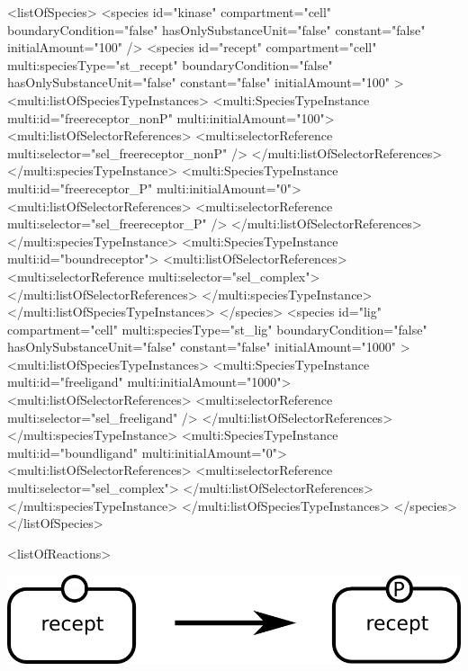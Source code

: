 \begin{example}
    <listOfSpecies>
      <species id="kinase" compartment="cell" boundaryCondition="false" 
               hasOnlySubstanceUnit="false" constant="false" initialAmount="100" />
      <species id="recept" compartment="cell" multi:speciesType="st_recept" 
               boundaryCondition="false" hasOnlySubstanceUnit="false" 
               constant="false" initialAmount="100" >
        <multi:listOfSpeciesTypeInstances>
          <multi:SpeciesTypeInstance multi:id="freereceptor_nonP" 
                                     multi:initialAmount="100">
            <multi:listOfSelectorReferences>
              <multi:selectorReference multi:selector="sel_freereceptor_nonP" />
            </multi:listOfSelectorReferences>
          </multi:speciesTypeInstance>
          <multi:SpeciesTypeInstance multi:id="freereceptor_P" 
                                     multi:initialAmount="0">
            <multi:listOfSelectorReferences>
              <multi:selectorReference multi:selector="sel_freereceptor_P" />
            </multi:listOfSelectorReferences>
          </multi:speciesTypeInstance>
          <multi:SpeciesTypeInstance multi:id="boundreceptor">
            <multi:listOfSelectorReferences>
              <multi:selectorReference multi:selector="sel_complex">
            </multi:listOfSelectorReferences>
          </multi:speciesTypeInstance>
        </multi:listOfSpeciesTypeInstances>
      </species>
      <species id="lig" compartment="cell" multi:speciesType="st_lig" 
                       boundaryCondition="false" 
               hasOnlySubstanceUnit="false" constant="false" initialAmount="1000" >
        <multi:listOfSpeciesTypeInstances>
          <multi:SpeciesTypeInstance multi:id="freeligand" multi:initialAmount="1000">
            <multi:listOfSelectorReferences>
              <multi:selectorReference multi:selector="sel_freeligand" />
            </multi:listOfSelectorReferences>
          </multi:speciesTypeInstance>
          <multi:SpeciesTypeInstance multi:id="boundligand" multi:initialAmount="0">
            <multi:listOfSelectorReferences>
              <multi:selectorReference multi:selector="sel_complex">
            </multi:listOfSelectorReferences>
          </multi:speciesTypeInstance>
        </multi:listOfSpeciesTypeInstances>
      </species>
    </listOfSpecies>

    <listOfReactions>
\end{example}

\includegraphics{figs/pngs/ReceptPhosphorylation.png}

